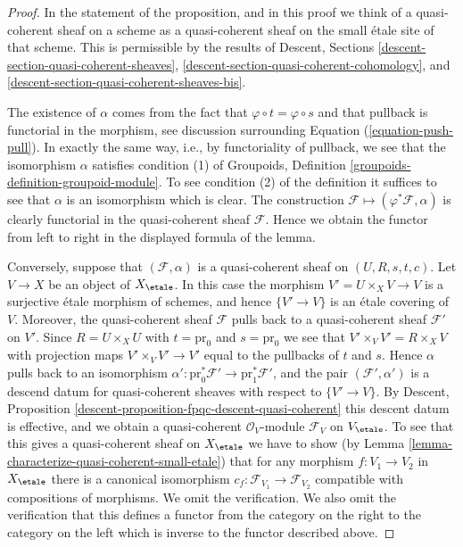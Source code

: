\begin{proof}
In the statement of the proposition, and in this proof we think of a
quasi-coherent sheaf on a scheme as a quasi-coherent sheaf on the small
\'etale site of that scheme. This is permissible by the results of
Descent, Sections \ref{descent-section-quasi-coherent-sheaves},
\ref{descent-section-quasi-coherent-cohomology}, and
\ref{descent-section-quasi-coherent-sheaves-bis}.

\medskip\noindent
The existence of $\alpha$ comes from the fact that
$\varphi \circ t = \varphi \circ s$ and that pullback is
functorial in the morphism, see discussion surrounding
Equation (\ref{equation-push-pull}). In exactly the same way, i.e., by
functoriality of pullback, we see that the isomorphism $\alpha$ satisfies
condition (1) of
Groupoids, Definition \ref{groupoids-definition-groupoid-module}.
To see condition (2) of the definition it suffices to see that $\alpha$
is an isomorphism which is clear. The construction
$\mathcal{F} \mapsto (\varphi^*\mathcal{F}, \alpha)$
is clearly functorial in the quasi-coherent sheaf $\mathcal{F}$.
Hence we obtain the functor from left to right in the displayed
formula of the lemma.

\medskip\noindent
Conversely, suppose that $(\mathcal{F}, \alpha)$ is a quasi-coherent
sheaf on $(U, R, s, t, c)$. Let $V \to X$ be an object of $X_\etale$.
In this case the morphism $V' = U \times_X V \to V$ is a surjective \'etale
morphism of schemes, and hence $\{V' \to V\}$ is an \'etale
covering of $V$. Moreover, the quasi-coherent sheaf $\mathcal{F}$
pulls back to a quasi-coherent sheaf $\mathcal{F}'$ on $V'$.
Since $R = U \times_X U$ with $t = \text{pr}_0$ and $s = \text{pr}_0$
we see that $V' \times_V V' = R \times_X V$ with projection maps
$V' \times_V V' \to V'$ equal to the pullbacks of $t$ and $s$. Hence
$\alpha$ pulls back to an isomorphism
$\alpha' : \text{pr}_0^*\mathcal{F}' \to \text{pr}_1^*\mathcal{F}'$, and
the pair $(\mathcal{F}', \alpha')$ is a descend datum for quasi-coherent
sheaves with respect to $\{V' \to V\}$. By
Descent, Proposition
\ref{descent-proposition-fpqc-descent-quasi-coherent}
this descent datum is effective, and we obtain a quasi-coherent
$\mathcal{O}_V$-module $\mathcal{F}_V$ on $V_\etale$.
To see that this gives a quasi-coherent sheaf on $X_\etale$ we have
to show (by
Lemma \ref{lemma-characterize-quasi-coherent-small-etale})
that for any morphism $f : V_1 \to V_2$ in $X_\etale$
there is a canonical isomorphism
$c_f : \mathcal{F}_{V_1} \to \mathcal{F}_{V_2}$
compatible with compositions of morphisms. We omit the verification.
We also omit the verification that this defines a functor from the
category on the right to the category on the left which is inverse
to the functor described above.
\end{proof}

